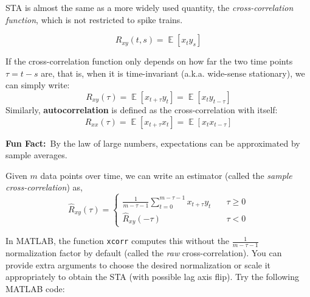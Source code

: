 \documentclass[letterpaper,11pt]{exam}
\DeclareMathOperator*{\E}{\mathbb{E}} %
\newcommand{\funfact}{\textbf{Fun Fact:}~}
\begin{document}
\begin{questions}
\newpage
STA is almost the same as a more widely used quantity, the \emph{cross-correlation function}, which is not restricted to spike trains.
\begin{tcolorbox}[colback=red!5!white,colframe=red!50!black]
\noindent
\begin{equation}
    R_{xy}(t,s) = \E[x_{t}y_s]
\end{equation}
\end{tcolorbox}
If the cross-correlation function only depends on how far the two time points $\tau = t-s$ are, that is, when it is time-invariant (a.k.a. wide-sense stationary), we can simply write:
\begin{equation}
    R_{xy}(\tau) = \E[x_{t+\tau}y_t] = \E[x_t y_{t-\tau}]
\end{equation}
Similarly, \textbf{autocorrelation} is defined as the cross-correlation with itself:
\begin{equation}
    R_{xx}(\tau) = \E[x_{t+\tau}x_t] = \E[x_t x_{t-\tau}]
\end{equation}
\begin{tcolorbox}
    \funfact By the law of large numbers, expectations can be approximated by sample averages.
\end{tcolorbox}
Given $m$ data points over time, we can write an estimator (called the \emph{sample cross-correlation}) as,
\begin{equation}
    \hat{R}_{xy}(\tau) = 
    \begin{cases}
	\frac{1}{m-\tau-1}\sum_{t=0}^{m-\tau-1} x_{t+\tau} y_t & \quad \tau \geq 0\\
	\hat{R}_{xy}(-\tau) & \quad \tau < 0
    \end{cases}
\end{equation}

In MATLAB, the function \texttt{xcorr} computes this without the $\frac{1}{m-\tau-1}$ normalization factor by default (called the \emph{raw} cross-correlation). You can provide extra arguments to choose the desired normalization or scale it appropriately to obtain the STA (with possible lag axis flip).
Try the following MATLAB code:



\end{questions}
\end{document}
